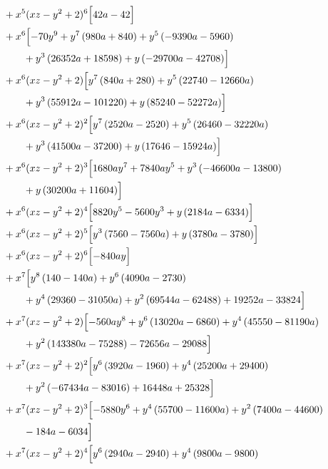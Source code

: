\begin{align*}
&{}+x^{5}(xz-y^2+2)^{6}\Bigl[42 a - 42\Bigr]\\
&{}+x^{6}\Bigl[- 70 y^{9} + y^{7} \left(980 a + 840\right) + y^{5} \left(- 9390 a - 5960\right)\\
&\qquad + y^{3} \left(26352 a + 18598\right) + y \left(- 29700 a - 42708\right)\Bigr]\\
&{}+x^{6}(xz-y^2+2)\Bigl[y^{7} \left(840 a + 280\right) + y^{5} \left(22740 - 12660 a\right)\\
&\qquad + y^{3} \left(55912 a - 101220\right) + y \left(85240 - 52272 a\right)\Bigr]\\
&{}+x^{6}(xz-y^2+2)^{2}\Bigl[y^{7} \left(2520 a - 2520\right) + y^{5} \left(26460 - 32220 a\right)\\
&\qquad + y^{3} \left(41500 a - 37200\right) + y \left(17646 - 15924 a\right)\Bigr]\\
&{}+x^{6}(xz-y^2+2)^{3}\Bigl[1680 a y^{7} + 7840 a y^{5} + y^{3} \left(- 46600 a - 13800\right)\\
&\qquad + y \left(30200 a + 11604\right)\Bigr]\\
&{}+x^{6}(xz-y^2+2)^{4}\Bigl[8820 y^{5} - 5600 y^{3} + y \left(2184 a - 6334\right)\Bigr]\\
&{}+x^{6}(xz-y^2+2)^{5}\Bigl[y^{3} \left(7560 - 7560 a\right) + y \left(3780 a - 3780\right)\Bigr]\\
&{}+x^{6}(xz-y^2+2)^{6}\Bigl[- 840 a y\Bigr]\\
&{}+x^{7}\Bigl[y^{8} \left(140 - 140 a\right) + y^{6} \left(4090 a - 2730\right)\\
&\qquad + y^{4} \left(29360 - 31050 a\right) + y^{2} \left(69544 a - 62488\right) + 19252 a - 33824\Bigr]\\
&{}+x^{7}(xz-y^2+2)\Bigl[- 560 a y^{8} + y^{6} \left(13020 a - 6860\right) + y^{4} \left(45550 - 81190 a\right)\\
&\qquad + y^{2} \left(143380 a - 75288\right) - 72656 a - 29088\Bigr]\\
&{}+x^{7}(xz-y^2+2)^{2}\Bigl[y^{6} \left(3920 a - 1960\right) + y^{4} \left(25200 a + 29400\right)\\
&\qquad + y^{2} \left(- 67434 a - 83016\right) + 16448 a + 25328\Bigr]\\
&{}+x^{7}(xz-y^2+2)^{3}\Bigl[- 5880 y^{6} + y^{4} \left(55700 - 11600 a\right) + y^{2} \left(7400 a - 44600\right)\\
&\qquad - 184 a - 6034\Bigr]\\
&{}+x^{7}(xz-y^2+2)^{4}\Bigl[y^{6} \left(2940 a - 2940\right) + y^{4} \left(9800 a - 9800\right)\\

\end{align*}

